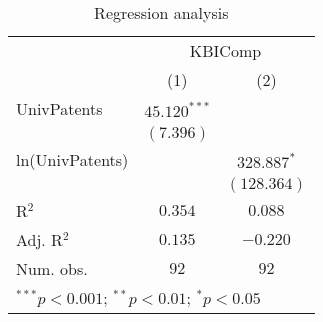 
\begin{table}[h]
\begin{center}
\begin{tabular}{l c c}
\hline
 & \multicolumn{2}{c}{KBIComp} \\
\cline{2-3}
 & (1) & (2) \\
\hline
UnivPatents     & $45.120^{***}$ &               \\
                & $(7.396)$      &               \\
ln(UnivPatents) &                & $328.887^{*}$ \\
                &                & $(128.364)$   \\
\hline
R$^2$           & $0.354$        & $0.088$       \\
Adj. R$^2$      & $0.135$        & $-0.220$      \\
Num. obs.       & $92$           & $92$          \\
\hline
\multicolumn{3}{l}{\scriptsize{$^{***}p<0.001$; $^{**}p<0.01$; $^{*}p<0.05$}}
\end{tabular}
\caption{Regression analysis}
\label{table:coefficients}
\end{center}
\end{table}

